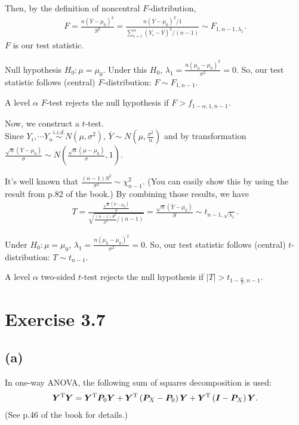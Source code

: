 \documentclass[a4paper]{article}
\begin{document}
Then, by the definition of noncentral $F$-distribution,
\begin{align*}
F = \frac{n(\overline{Y} - \mu_{0})^2}{S^2} = \frac{n(\overline{Y} - \mu_{0})^2 / 1}{\sum_{i=1}^{n} (Y_{i} - \overline{Y})^{2} / (n-1)} \sim F_{1, n-1, \lambda_{1}}.
\end{align*}
$F$ is our test statistic.

Null hypothesis $H_{0}: \mu = \mu_{0}$. Under this $H_{0}$, $\lambda_{1} = \frac{n(\mu_{0} - \mu_{0})^2}{\sigma^2} = 0$. So, our test statistic follows (central) $F$-distribution: $F \sim F_{1, n-1}$.

A level $\alpha$ $F$-test rejects the null hypothesis if  $F > f_{1-\alpha, 1, n-1}$.\\
\vspace{\baselineskip}


Now, we construct a $t$-test.\\
Since $Y_{i}, \cdots Y_{n} \stackrel{i.i.d.}{\sim} N(\mu, \sigma^2)$, $\overline{Y} \sim N\left(\mu, \frac{\sigma^2}{n} \right)$ and by transformation $\frac{\sqrt{n}(\overline{Y} -\mu_{0})}{\sigma} \sim N\left(\frac{\sqrt{n}(\mu -\mu_{0})}{\sigma}, 1\right)$.

It's well known that $\frac{(n-1)S^2}{\sigma^2} \sim \chi_{n-1}^2$. (You can easily show this by using the result from p.82 of the book.) By combining those results, we have
\begin{align*}
T = \frac{\frac{\sqrt{n}(\overline{Y} -\mu_{0})}{\sigma}}{\sqrt{\frac{(n-1)S^2}{\sigma^2}/(n-1)}} = \frac{\sqrt{n}(\overline{Y} - \mu_{0})}{S}  \sim t_{n-1, \sqrt{\lambda_{1}}}.
\end{align*}

Under $H_{0}: \mu = \mu_{0}$, $\lambda_{1} = \frac{n(\mu_{0} - \mu_{0})^2}{\sigma^2} = 0$. So, our test statistic follows (central) $t$-distribution: $T \sim t_{n-1}$.

A level $\alpha$ two-sided $t$-test rejects the null hypothesis if  $|T| > t_{1-\frac{\alpha}{2}, n-1}$.

\vspace{\baselineskip}
\section{Exercise 3.7}

\subsection{(a)}
In one-way ANOVA, the following sum of squares decomposition is used:
\begin{align*}
\bm{Y}^{\rm T}\bm{Y} = \bm{Y}^{\rm T}\bm{P}_{0}\bm{Y} +\bm{Y}^{\rm T}\left(\bm{P}_{X} -\bm{P}_{0} \right)\bm{Y} +\bm{Y}^{\rm T}\left(\bm{I} -\bm{P}_{X}\right)\bm{Y}.
\end{align*}
(See p.46 of the book for details.)
\end{document}
